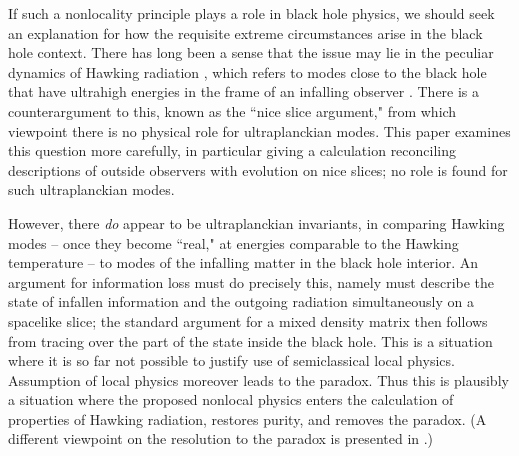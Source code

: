If such a nonlocality principle plays a role in black hole physics, we should seek an explanation for how the requisite extreme circumstances arise in the black hole context.  There has long been a sense that the issue may lie in the peculiar dynamics of Hawking radiation \Hawkevap, which refers to modes close to the black hole that have ultrahigh energies in the frame of an infalling observer .  There is a counterargument to this, known as the ``nice slice argument,"
from which viewpoint there is no physical role for ultraplanckian modes.  This paper examines this question more carefully, in particular giving a calculation reconciling descriptions of outside observers with evolution on nice slices;   no role is found for  such ultraplanckian modes.

However, there {\it do} appear to be ultraplanckian invariants, in comparing Hawking modes -- once they become ``real," at energies  comparable to the Hawking temperature -- to modes of the infalling matter in the black hole interior.  An argument for information loss must do precisely this, namely must describe the state  of infallen information and the outgoing radiation simultaneously on a spacelike slice; the standard argument for a mixed density matrix then follows from tracing over the part of the state inside  the black hole.  This is a situation where it is so far not possible to justify use of semiclassical local physics.  Assumption of local physics moreover leads to the paradox.  Thus this is plausibly a situation where the proposed nonlocal physics enters the calculation of properties of Hawking radiation, restores purity, and removes the paradox.  (A different viewpoint on the resolution to the paradox is presented in
.)



